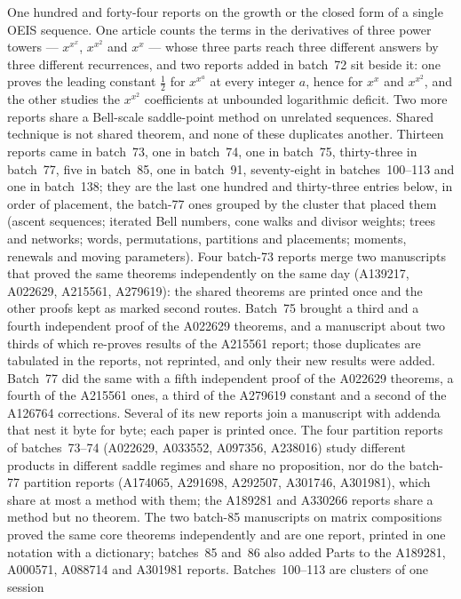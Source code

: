 \documentclass[11pt]{article}
\begin{document}
One hundred and forty-four reports on the growth or the closed form of a single OEIS sequence.  One
article counts the terms in the derivatives of three power towers --- $x^{x^x}$,
$x^{x^2}$ and $x^x$ --- whose three parts reach three different answers by three
different recurrences, and two reports added in batch~72 sit beside it: one
proves the leading constant $\tfrac12$ for $x^{x^a}$ at every integer $a$, hence
for $x^x$ and $x^{x^2}$, and the other studies the $x^{x^2}$ coefficients at
unbounded logarithmic deficit.  Two more reports share a Bell-scale
saddle-point method on unrelated sequences.  Shared technique is not shared
theorem, and none of these duplicates another.  Thirteen reports came in
batch~73, one in batch~74, one in batch~75, thirty-three in batch~77,
five in batch~85, one in batch~91, seventy-eight in batches~100--113 and
one in batch~138; they
are the last one hundred and thirty-three entries below, in order of placement, the batch-77 ones grouped by
the cluster that placed them (ascent sequences; iterated Bell numbers,
cone walks and divisor weights; trees and networks; words, permutations,
partitions and placements; moments, renewals and moving parameters).  Four
batch-73 reports merge two manuscripts that proved the same theorems
independently on the same day (A139217, A022629, A215561, A279619): the
shared theorems are printed once and the other proofs kept as marked second
routes.  Batch~75 brought a third and a fourth independent proof of the
A022629 theorems, and a manuscript about two thirds of which re-proves
results of the A215561 report; those duplicates are tabulated in the
reports, not reprinted, and only their new results were added.  Batch~77
did the same with a fifth independent proof of the A022629 theorems, a
fourth of the A215561 ones, a third of the A279619 constant and a second
of the A126764 corrections.  Several of its new reports join a manuscript
with addenda that nest it byte for byte; each paper is printed once.  The four
partition reports of batches~73--74 (A022629, A033552, A097356, A238016)
study different products in different saddle regimes and share no
proposition, nor do the batch-77 partition reports (A174065, A291698,
A292507, A301746, A301981), which share at most a method with them; the
A189281 and A330266 reports share a method but no theorem.  The two
batch-85 manuscripts on matrix compositions proved the same core theorems
independently and are one report, printed in one notation with a
dictionary; batches~85 and~86 also added Parts to the A189281, A000571,
A088714 and A301981 reports.  Batches~100--113 are clusters of one session
\end{document}
